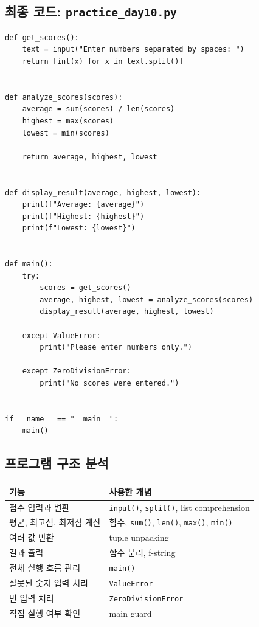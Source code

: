 \documentclass[11pt,a4paper]{article}
\begin{document}
\subsection{최종 코드: \texttt{practice\_day10.py}}

\begin{lstlisting}
def get_scores():
    text = input("Enter numbers separated by spaces: ")
    return [int(x) for x in text.split()]


def analyze_scores(scores):
    average = sum(scores) / len(scores)
    highest = max(scores)
    lowest = min(scores)

    return average, highest, lowest


def display_result(average, highest, lowest):
    print(f"Average: {average}")
    print(f"Highest: {highest}")
    print(f"Lowest: {lowest}")


def main():
    try:
        scores = get_scores()
        average, highest, lowest = analyze_scores(scores)
        display_result(average, highest, lowest)

    except ValueError:
        print("Please enter numbers only.")

    except ZeroDivisionError:
        print("No scores were entered.")


if __name__ == "__main__":
    main()
\end{lstlisting}

\subsection{프로그램 구조 분석}

\begin{center}
\begin{tabular}{ll}
\toprule
기능 & 사용한 개념 \\
\midrule
점수 입력과 변환 & \texttt{input()}, \texttt{split()}, list comprehension \\
평균, 최고점, 최저점 계산 & 함수, \texttt{sum()}, \texttt{len()}, \texttt{max()}, \texttt{min()} \\
여러 값 반환 & tuple unpacking \\
결과 출력 & 함수 분리, f-string \\
전체 실행 흐름 관리 & \texttt{main()} \\
잘못된 숫자 입력 처리 & \texttt{ValueError} \\
빈 입력 처리 & \texttt{ZeroDivisionError} \\
직접 실행 여부 확인 & main guard \\
\bottomrule
\end{tabular}
\end{center}
\end{document}
